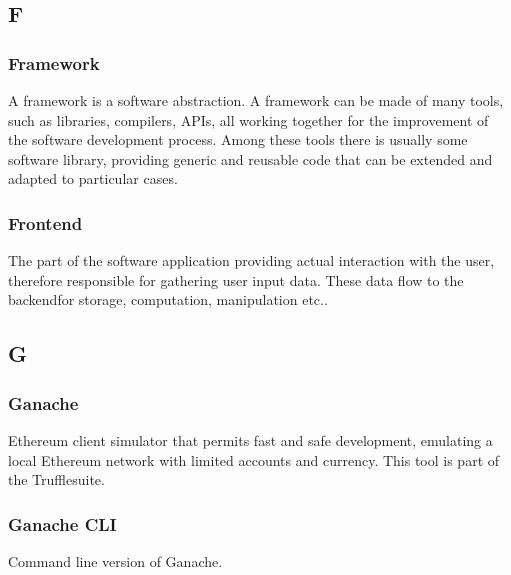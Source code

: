 

\subsection*{F}

\subsubsection*{Framework}
A framework is a software abstraction. A framework can be made of many tools, such as libraries, compilers, APIs\glo, all working together for the improvement of the software development process. Among these tools there is usually some software library, providing generic and reusable code that can be extended and adapted to particular cases.

\subsubsection*{Frontend}
The part of the software application providing actual interaction with the user, therefore responsible for gathering user input data. These data flow to the backend\glosp for storage, computation, manipulation etc..


\subsection*{G}

\subsubsection*{Ganache}
Ethereum client simulator that permits fast and safe development, emulating a local Ethereum network with limited accounts and currency. This tool is part of the Truffle\glosp suite.

\subsubsection*{Ganache CLI}
Command line version of Ganache.

